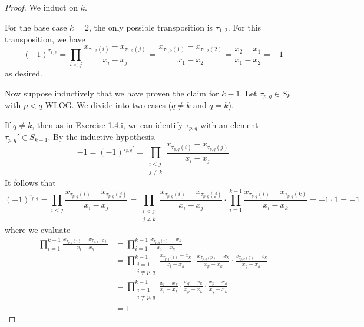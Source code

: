 \documentclass[../psets.tex]{subfiles}
\begin{document}
\begin{enumerate}[label={\textbf{1.4.\roman*.}}]
\begin{proof}
        We induct on $k$.\par\smallskip
        For the base case $k=2$, the only possible transposition is $\tau_{1,2}$. For this transposition, we have
        \begin{equation*}
            (-1)^{\tau_{1,2}} = \prod_{i<j}\frac{x_{\tau_{1,2}(i)}-x_{\tau_{1,2}(j)}}{x_i-x_j}
            = \frac{x_{\tau_{1,2}(1)}-x_{\tau_{1,2}(2)}}{x_1-x_2}
            = \frac{x_2-x_1}{x_1-x_2}
            = -1
        \end{equation*}
        as desired.\par\smallskip
        Now suppose inductively that we have proven the claim for $k-1$. Let $\tau_{p,q}\in S_k$ with $p<q$ WLOG. We divide into two cases ($q\neq k$ and $q=k$).\par
        If $q\neq k$, then as in Exercise 1.4.i, we can identify $\tau_{p,q}$ with an element $\tau_{p,q}'\in S_{k-1}$. By the inductive hypothesis,
        \begin{equation*}
            -1 = (-1)^{\tau_{p,q}'}
            = \prod_{\substack{i<j\\j\neq k}}\frac{x_{\tau_{p,q}(i)}-x_{\tau_{p,q}(j)}}{x_i-x_j}
        \end{equation*}
        It follows that
        \begin{equation*}
            (-1)^{\tau_{p,q}} = \prod_{i<j}\frac{x_{\tau_{p,q}(i)}-x_{\tau_{p,q}(j)}}{x_i-x_j}
            = \prod_{\substack{i<j\\j\neq k}}\frac{x_{\tau_{p,q}(i)}-x_{\tau_{p,q}(j)}}{x_i-x_j}\cdot\prod_{i=1}^{k-1}\frac{x_{\tau_{p,q}(i)}-x_{\tau_{p,q}(k)}}{x_i-x_k}
            = -1\cdot 1
            = -1
        \end{equation*}
        where we evaluate
        \begin{align*}
            \prod_{i=1}^{k-1}\frac{x_{\tau_{p,q}(i)}-x_{\tau_{p,q}(k)}}{x_i-x_k} &= \prod_{i=1}^{k-1}\frac{x_{\tau_{p,q}(i)}-x_k}{x_i-x_k}\\
            &= \prod_{\substack{i=1\\i\neq p,q}}^{k-1}\frac{x_{\tau_{p,q}(i)}-x_k}{x_i-x_k}\cdot\frac{x_{\tau_{p,q}(p)}-x_k}{x_p-x_k}\cdot\frac{x_{\tau_{p,q}(q)}-x_k}{x_q-x_k}\\
            &= \prod_{\substack{i=1\\i\neq p,q}}^{k-1}\frac{x_i-x_k}{x_i-x_k}\cdot\frac{x_q-x_k}{x_p-x_k}\cdot\frac{x_p-x_k}{x_q-x_k}\\
            &= 1
        \end{align*}\par

\end{proof}
\end{enumerate}
\end{document}
